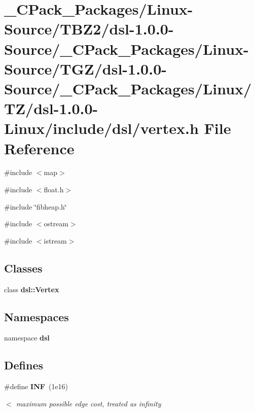 \section{\_\-CPack\_\-Packages/Linux-\/Source/TBZ2/dsl-\/1.0.0-\/Source/\_\-CPack\_\-Packages/Linux-\/Source/TGZ/dsl-\/1.0.0-\/Source/\_\-CPack\_\-Packages/Linux/TZ/dsl-\/1.0.0-\/Linux/include/dsl/vertex.h File Reference}
\label{__CPack__Packages_2Linux-Source_2TBZ2_2dsl-1_80_80-Source_2__CPack__Packages_2Linux-Source_2TGZ_5051a5440c7b57ec43ebc3dec9597e16}
{\ttfamily \#include $<$map$>$}\par
{\ttfamily \#include $<$float.h$>$}\par
{\ttfamily \#include \char`\"{}fibheap.h\char`\"{}}\par
{\ttfamily \#include $<$ostream$>$}\par
{\ttfamily \#include $<$istream$>$}\par
\subsection*{Classes}
\begin{DoxyCompactItemize}
\item 
class {\bf dsl::Vertex}
\end{DoxyCompactItemize}
\subsection*{Namespaces}
\begin{DoxyCompactItemize}
\item 
namespace {\bf dsl}
\end{DoxyCompactItemize}
\subsection*{Defines}
\begin{DoxyCompactItemize}
\item 
\#define {\bf INF}~(1e16)
\begin{DoxyCompactList}\small\item\em $<$ maximum possible edge cost, treated as infinity \item\end{DoxyCompactList}\end{DoxyCompactItemize}
